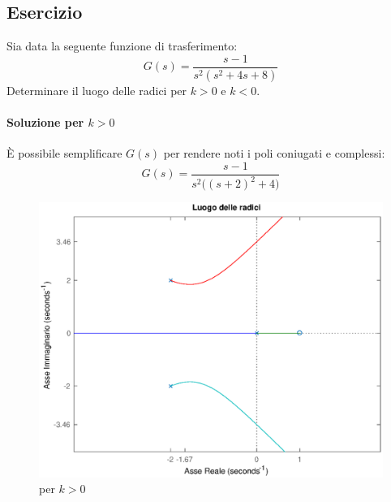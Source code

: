 \subsection{Esercizio}
Sia data la seguente funzione di trasferimento:
\[
	G(s) = \frac{s-1}{s^2(s^2+4s+8)}
\]
Determinare il luogo delle radici per \(k>0\) e \(k<0\).

\paragraph{Soluzione per \(k>0\)}
È possibile semplificare \(G(s)\) per rendere noti i poli coniugati e complessi:
\[
	G(s) = \frac{s-1}{s^2\bigl( (s+2)^2 +4 \bigr)}
\]

\begin{figure}[ht]
	\centering
	\includegraphics[scale=.5]{mod1/assets/rl_ex311}
	\caption{per \(k>0\)}
\end{figure}

